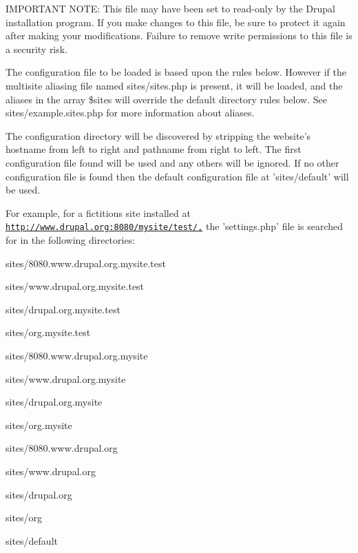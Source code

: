 IMPORTANT NOTE: This file may have been set to read-\/only by the Drupal installation program. If you make changes to this file, be sure to protect it again after making your modifications. Failure to remove write permissions to this file is a security risk.

The configuration file to be loaded is based upon the rules below. However if the multisite aliasing file named sites/sites.php is present, it will be loaded, and the aliases in the array \$sites will override the default directory rules below. See sites/example.sites.php for more information about aliases.

The configuration directory will be discovered by stripping the website's hostname from left to right and pathname from right to left. The first configuration file found will be used and any others will be ignored. If no other configuration file is found then the default configuration file at 'sites/default' will be used.

For example, for a fictitious site installed at \href{http://www.drupal.org:8080/mysite/test/,}{\tt http://www.drupal.org:8080/mysite/test/,} the 'settings.php' file is searched for in the following directories:


\begin{DoxyItemize}
\item sites/8080.www.drupal.org.mysite.test
\item sites/www.drupal.org.mysite.test
\item sites/drupal.org.mysite.test
\item sites/org.mysite.test
\end{DoxyItemize}


\begin{DoxyItemize}
\item sites/8080.www.drupal.org.mysite
\item sites/www.drupal.org.mysite
\item sites/drupal.org.mysite
\item sites/org.mysite
\end{DoxyItemize}


\begin{DoxyItemize}
\item sites/8080.www.drupal.org
\item sites/www.drupal.org
\item sites/drupal.org
\item sites/org
\end{DoxyItemize}


\begin{DoxyItemize}
\item sites/default
\end{DoxyItemize}

